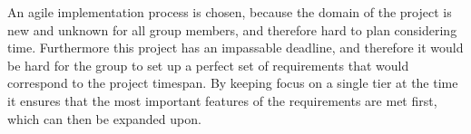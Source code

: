 An agile implementation process is chosen, because the domain of the project is new and unknown for all group members, and therefore hard to plan considering time. Furthermore this project has an impassable deadline, and therefore it would be hard for the group to set up a perfect set of requirements that would correspond to the project timespan. By keeping focus on a single tier at the time it ensures that the most important features of the requirements are met first, which can then be expanded upon.
































